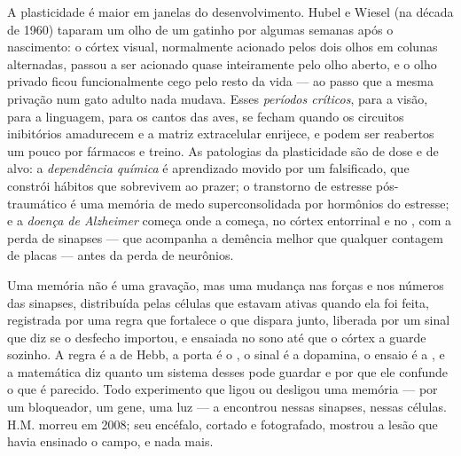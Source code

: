 \begin{definition}\label{def:b3:learning-memory:critical}
A plasticidade é maior em janelas do desenvolvimento. Hubel e Wiesel (na
década de 1960) taparam um olho de um gatinho por algumas semanas após o
nascimento: o córtex visual, normalmente acionado pelos dois olhos em
colunas alternadas, passou a ser acionado quase inteiramente pelo olho
aberto, e o olho privado ficou funcionalmente cego pelo resto da vida
--- ao passo que a mesma privação num gato adulto nada mudava. Esses
\emph{períodos críticos}, para a visão, para a linguagem, para os cantos
das aves, se fecham quando os circuitos inibitórios amadurecem e a
matriz extracelular enrijece, e podem ser reabertos um pouco por
fármacos e treino. As patologias da plasticidade são de dose e de alvo:
a \emph{dependência química} é aprendizado movido por um  falsificado, que constrói hábitos que sobrevivem ao prazer; o
transtorno de estresse pós-traumático é uma memória de medo
superconsolidada por hormônios do estresse; e a \emph{doença de
Alzheimer} começa onde a  começa, no córtex
entorrinal e no , com a perda de sinapses --- que acompanha a
demência melhor que qualquer contagem de placas --- antes da perda de
neurônios.
\end{definition}

\begin{remark}\label{rem:b3:learning-memory:what}
Uma memória não é uma gravação, mas uma mudança nas forças e nos números
das sinapses, distribuída pelas células que estavam ativas quando ela
foi feita, registrada por uma regra que fortalece o que dispara junto,
liberada por um sinal que diz se o desfecho importou, e ensaiada no sono
até que o córtex a guarde sozinho. A regra é a de Hebb, a porta é o
, o sinal é a dopamina, o ensaio é a , e a
matemática diz quanto um sistema desses pode guardar e por que ele
confunde o que é parecido. Todo experimento que ligou ou desligou uma
memória --- por um bloqueador, um gene, uma luz --- a encontrou nessas
sinapses, nessas células. H.M. morreu em 2008; seu encéfalo, cortado e
fotografado, mostrou a lesão que havia ensinado o campo, e nada mais.
\end{remark}

